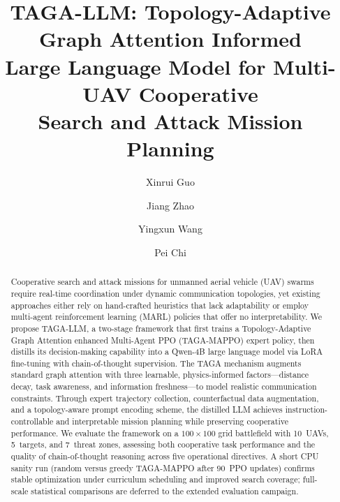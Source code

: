 \documentclass{styles/svproc}
\begin{document}
\mainmatter

\title{TAGA-LLM: Topology-Adaptive Graph Attention Informed\\
Large Language Model for Multi-UAV Cooperative\\
Search and Attack Mission Planning}


\author{Xinrui Guo \and Jiang Zhao \and Yingxun Wang
\and Pei Chi}




\maketitle

\begin{abstract}
Cooperative search and attack missions for unmanned aerial vehicle (UAV) swarms
require real-time coordination under dynamic communication topologies, yet
existing approaches either rely on hand-crafted heuristics that lack
adaptability or employ multi-agent reinforcement learning (MARL) policies that
offer no interpretability.  We propose TAGA-LLM, a two-stage framework
that first trains a Topology-Adaptive Graph Attention enhanced Multi-Agent PPO
(TAGA-MAPPO) expert policy, then distills its decision-making capability into a
Qwen-4B large language model via LoRA fine-tuning with chain-of-thought
supervision.  The TAGA mechanism augments standard graph attention with three
learnable, physics-informed factors---distance decay, task awareness, and
information freshness---to model realistic communication constraints. Through
expert trajectory collection, counterfactual data augmentation, and a
topology-aware prompt encoding scheme, the distilled LLM achieves
instruction-controllable and interpretable mission planning while preserving
cooperative performance.  We evaluate the framework on a $100\!\times\!100$ grid
battlefield with 10~UAVs, 5~targets, and 7~threat zones, assessing both
cooperative task performance and the quality of chain-of-thought reasoning
across five operational directives.  A short CPU sanity run (random versus
greedy TAGA-MAPPO after $90$~PPO updates) confirms stable optimization under
curriculum scheduling and improved search coverage; full-scale statistical
comparisons are deferred to the extended evaluation campaign.
\end{abstract}
\end{document}
